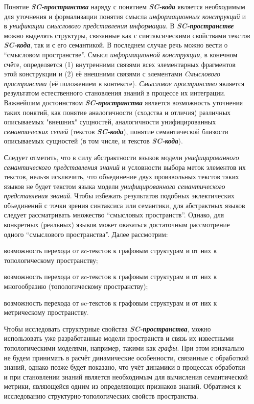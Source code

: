 Понятие \textbf{\textit{SC-пространства}} наряду с понятием \textbf{\textit{SC-кода}} является необходимым для уточнения и формализации понятия смысла \textit{информационных конструкций} и в \textit{унификации смыслового представления информации}. В \textbf{\textit{SC-пространстве}} можно выделять структуры, связанные как с синтаксическими свойствами текстов \textbf{\textit{SC-кода}}, так и с его семантикой. В последнем случае речь можно вести о ``смысловом пространстве''. Смысл \textit{информационной конструкции}, в конечном счёте, определяется (1) внутренними связями всех элементарных фрагментов этой конструкции и (2) её внешними связями с элементами \textit{Cмыслового пространства} (её положением в контексте). \textit{Смысловое пространство} является результатом естественного становления знаний в процессе их интеграции.
Важнейшим достоинством \textbf{\textit{SC-пространства}} является возможность уточнения таких понятий, как понятие аналогичности (сходства и отличия) различных описываемых "внешних"{} сущностей, аналогичности унифицированных \textit{семантических сетей} (текстов \textbf{\textit{SC-кода}}), понятие семантической близости описываемых сущностей (в том числе, и текстов \textbf{\textit{SC-кода}}).

Следует отметить, что в силу абстрактности языков модели \textit{унифицированного семантического представления знаний} и условности выбора меток элементов их текстов, нельзя исключить, что объединение двух произвольных текстов таких языков не будет текстом языка модели \textit{унифицированного семантического представления знаний}. Чтобы избежать результатов подобных эклектических объединений с точки зрения синтаксиса или семантики, для абстрактных языков следует рассматривать множество ``смысловых пространств''. Однако, для конкретных (реальных) языков может оказаться достаточным рассмотрение одного ``смыслового пространства''.
Далее рассмотрим:

\begin{textitemize}
	\item возможность перехода от sc-текстов к графовым структурам и от них к топологическому пространству;
	\item возможность перехода от sc-текстов к графовым структурам и от них к многообразию (топологическому пространству);
	\item возможность перехода от sc-текстов к графовым структурам и от них к метрическому пространству.
\end{textitemize}

Чтобы исследовать структурные свойства \textbf{\textit{SC-пространства}}, можно использовать уже разработанные модели пространств и связь их известными топологическими моделями, например, такими как \textit{графы}. При этом изначально не будем принимать в расчёт динамические особенности, связанные с обработкой знаний, однако позже будет показано, что учёт динамики в процессах обработки и при становлении знаний является необходимым для вычисления семантической метрики, являющейся одним из определяющих признаков знаний.
Обратимся к исследованию структурно-топологических свойств пространства.

